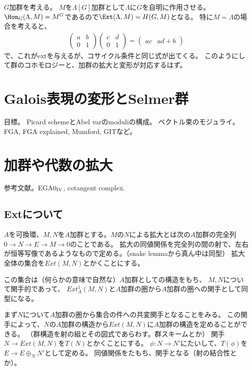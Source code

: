 \documentclass{jsarticle}
\begin{document}
$G$加群を考える。
$M$を$\Lambda[G]$加群として$\Lambda$に$G$を自明に作用させる。
$\Hom_G(\Lambda,M)=M^G$であるので$\Ext(\Lambda,M)=H(G,M)$となる。
特に$M=\Lambda$の場合を考えると、
\begin{align*}
\begin{pmatrix}a&b\\0&1\end{pmatrix}\begin{pmatrix}c&d\\0&1\end{pmatrix}=\begin{pmatrix}ac&ad+b\end{pmatrix}
\end{align*}
で、これがextを与えるが、コサイクル条件と同じ式が出てくる。
このようにして群のコホモロジーと、加群の拡大と変形が対応するはず。

\section{Galois表現の変形とSelmer群}

目標。
Picard schemeとAbel varのmoduliの構成。
ベクトル束のモジュライ。
FGA, FGA explained, Mumford, GITなど。

\section{加群や代数の拡大}
参考文献。EGA$0_{{\rm IV}}$, cotangent complex.

\subsection{Extについて}
\begin{dfn}
$A$を可換環、$M, N$を$A$加群とする。$M$の$N$による拡大とは次の$A$加群の完全列$0 \to N \to E \to M \to 0$のことである。
拡大の同値関係を完全列の間の射で、左右が恒等写像であるようなもので定める。（snake lemmaから真ん中は同型）
拡大全体の集合を$Ext(M, N)$とかくことにする。
\end{dfn}

\begin{prop}
この集合は（何らかの意味で自然な）$A$加群としての構造をもち、
$M, N$について関手的であって、
$Ext^1_A(M, N)$と$A$加群の圏から$A$加群の圏への関手として同型になる。
\end{prop}

まず$N$について$A$加群の圏から集合の件への共変関手となることをみる。
この関手によって、$N$の$A$加群の構造から$Ext(M, N)$に$A$加群の構造を定めることができる。
（群構造を射の組とその図式であらわす。群スキームとか）
関手$N \to Ext(M, N)$を$T(N)$とかくことにする。
$\phi: N \to N'$にたいして、$T(\phi)$を$E \to E \oplus_N N'$として定める。
同値関係をたもち、関手となる（射の結合性とか）。
\end{document}

